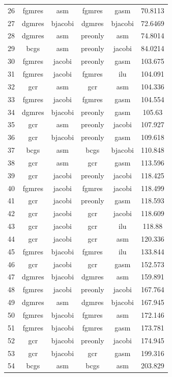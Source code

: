 \begin{table}[h]
\begin{tabular}{cccccc}
    26 & fgmres & asm & fgmres & gasm & 70.8113 \\
    27 & dgmres & bjacobi & dgmres & bjacobi & 72.6469 \\
    28 & dgmres & asm & preonly & asm & 74.8014 \\
    29 & bcgs & asm & preonly & jacobi & 84.0214 \\
    30 & fgmres & jacobi & preonly & gasm & 103.675 \\
    31 & fgmres & jacobi & fgmres & ilu & 104.091 \\
    32 & gcr & asm & gcr & asm & 104.336 \\
    33 & fgmres & jacobi & fgmres & gasm & 104.554 \\
    34 & dgmres & bjacobi & preonly & gasm & 105.63 \\
    35 & gcr & asm & preonly & jacobi & 107.927 \\
    36 & gcr & bjacobi & preonly & gasm & 109.618 \\
    37 & bcgs & asm & bcgs & bjacobi & 110.848 \\
    38 & gcr & asm & gcr & gasm & 113.596 \\
    39 & gcr & jacobi & preonly & jacobi & 118.425 \\
    40 & fgmres & jacobi & fgmres & jacobi & 118.499 \\
    41 & gcr & jacobi & preonly & gasm & 118.593 \\
    42 & gcr & jacobi & gcr & jacobi & 118.609 \\
    43 & gcr & jacobi & gcr & ilu & 118.88 \\
    44 & gcr & jacobi & gcr & asm & 120.336 \\
    45 & fgmres & bjacobi & fgmres & ilu & 133.844 \\
    46 & gcr & jacobi & gcr & gasm & 152.573 \\
    47 & dgmres & bjacobi & dgmres & asm & 159.891 \\
    48 & fgmres & jacobi & preonly & jacobi & 167.764 \\
    49 & dgmres & asm & dgmres & bjacobi & 167.945 \\
    50 & fgmres & bjacobi & fgmres & asm & 172.146 \\
    51 & fgmres & bjacobi & fgmres & gasm & 173.781 \\
    52 & gcr & bjacobi & preonly & jacobi & 174.945 \\
    53 & gcr & bjacobi & gcr & gasm & 199.316 \\
    54 & bcgs & asm & bcgs & asm & 203.829 \\

\end{tabular}
\end{table}
